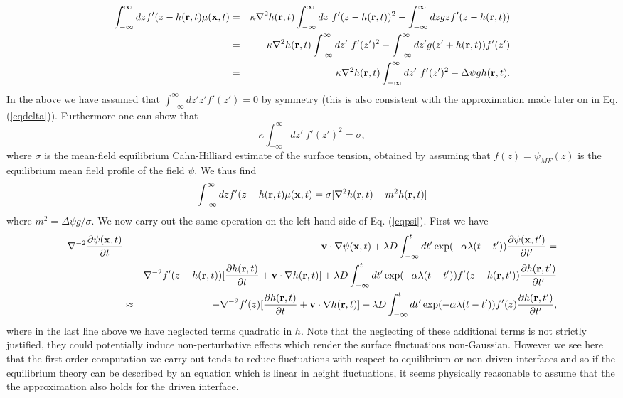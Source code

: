 \begin{eqnarray}
\int_{-\infty}^\infty dz f'(z-h({\bf r},t)\mu({\bf x},t)&=& \kappa \nabla^2 h({\bf r},t)\int_{-\infty}^\infty dz\ f'(z-h({\bf r},t))^2 - \int_{-\infty}^\infty dz gz f'(z-h({\bf r},t))\nonumber \\&=&
\kappa\nabla^2 h({\bf r},t)\int_{-\infty}^\infty dz'\ f'(z')^2 - \int_{-\infty}^\infty dz' g(z' +h({\bf r},t)) f'(z')\nonumber \\
&=& \kappa\nabla^2 h({\bf r},t)\int_{-\infty}^\infty dz' \ f'(z')^2 -\Delta\psi g h({\bf r},t).
\end{eqnarray}
In the above we have assumed that $\int_{-\infty}^\infty dz' z'f'(z')=0$ by symmetry (this is also consistent with the approximation made later on in Eq. (\ref{eqdelta})). Furthermore one can show that \cite{bray2001,bray2002}
\begin{equation}
\kappa\int_{-\infty}^\infty dz' \ f'(z')^2 = \sigma,\label{mfsig}
\end{equation}
where $\sigma$ is the mean-field equilibrium Cahn-Hilliard estimate of the surface tension, obtained by  assuming that $f(z)=\psi_{MF}(z)$ is the equilibrium mean field profile of the field 
$\psi$. We thus find
\begin{equation}
\int_{-\infty}^\infty dz f'(z-h({\bf r},t)\mu({\bf x},t) = \sigma[\nabla^2 h({\bf r},t)-m^2 h({\bf r},t)]
\end{equation}
where $m^2 = \Delta\psi g /\sigma$. We now carry out the same operation on the left hand side of Eq. (\ref{eqpsi}). First we have
\begin{eqnarray}
\nabla^{-2}\frac{\partial \psi({\bf x},t)}{\partial t}&+&{\bf v}\cdot\nabla \psi({\bf x},t) +\lambda D\int_{-\infty}^t dt'
\exp(-\alpha\lambda(t-t')) \frac{\partial \psi({\bf x},t')}{\partial t'} = \nonumber \\ 
&-&\nabla^{-2}f'(z-h({\bf r},t))[\frac{\partial h({\bf r},t)}{\partial t} +{\bf v}\cdot\nabla h({\bf r},t)]  +\lambda D\int_{-\infty}^t dt'
\exp(-\alpha\lambda(t-t')) f'(z-h({\bf r},t'))\frac{\partial h({\bf r},t')}{\partial t'}\nonumber \\
&\approx& -\nabla^{-2}f'(z) [\frac{\partial h({\bf r},t)}{\partial t} +{\bf v}\cdot\nabla h({\bf r},t)] +\lambda D\int_{-\infty}^t dt'
\exp(-\alpha\lambda(t-t')) f'(z)\frac{\partial h({\bf r},t')}{\partial t'},\end{eqnarray}
where in the last line above we have neglected terms quadratic in $h$. 
Note that the neglecting of these additional terms is not strictly justified, they could potentially induce non-perturbative effects which render the surface fluctuations non-Gaussian. However we see here that the first order computation we carry out tends to reduce fluctuations with respect to equilibrium or non-driven interfaces and so if the equilibrium theory can be described by an equation which is linear in height fluctuations, it seems physically reasonable to assume that the the approximation also holds for the driven interface. 

